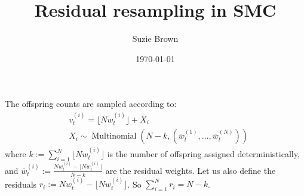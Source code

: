 \documentclass[fleqn]{article}
\title{Residual resampling in SMC}
\author{Suzie Brown}
\date{\today}
\newcommand{\Mn}{\operatorname{Multinomial}}
\newcommand{\vt}[2][t]{v_{#1}^{(#2)}}
\newcommand{\wt}[2][t]{w_{#1}^{(#2)}}
\newcommand{\wbar}[2][t]{\bar{w}_{#1}^{(#2)}}
\begin{document}
\maketitle
\thispagestyle{fancy}

The offspring counts are sampled according to:
\begin{align*}
& \vt{i} = \lfloor N \wt{i} \rfloor + X_i \\
& X_i \sim \Mn (N-k, (\wbar{1}, \dots, \wbar{N}))
\end{align*}
where $k := \sum_{i=1}^N \lfloor N \wt{i} \rfloor$ is the number of offspring assigned deterministically, and $\wbar{i} := \frac{N\wt{i} - \lfloor N \wt{i} \rfloor}{N - k}$ are the residual weights. Let us also define the residuals $r_i := N\wt{i} - \lfloor N \wt{i} \rfloor$. So $\sum_{i=1}^N r_i = N-k$.
\end{document}

